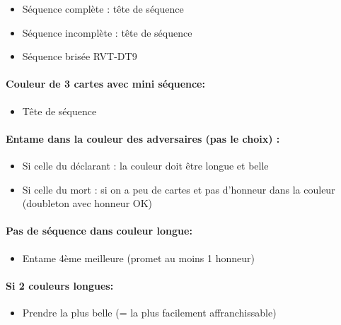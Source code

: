 \documentclass[a4paper]{article}
\begin{document}
\begin{itemize}
\item Séquence complète : tête de séquence

\item Séquence incomplète : tête de séquence

\item Séquence brisée RVT-DT9

\end{itemize}

\paragraph{Couleur de 3 cartes avec mini séquence:}

\begin{itemize}
\item Tête de séquence

\end{itemize}

\paragraph{Entame dans la couleur des adversaires (pas le choix) :}

\begin{itemize}
\item Si celle du déclarant : la couleur doit être longue et belle

\item Si celle du mort : si on a peu de cartes et pas d’honneur dans la couleur (doubleton avec honneur OK)

\end{itemize}

\paragraph{Pas de séquence dans couleur longue:}

\begin{itemize}
\item Entame 4ème meilleure (promet au moins 1 honneur)

\end{itemize}

\paragraph{Si 2 couleurs longues:}

\begin{itemize}
\item Prendre la plus belle (= la plus facilement affranchissable)

\end{itemize}
\end{document}
